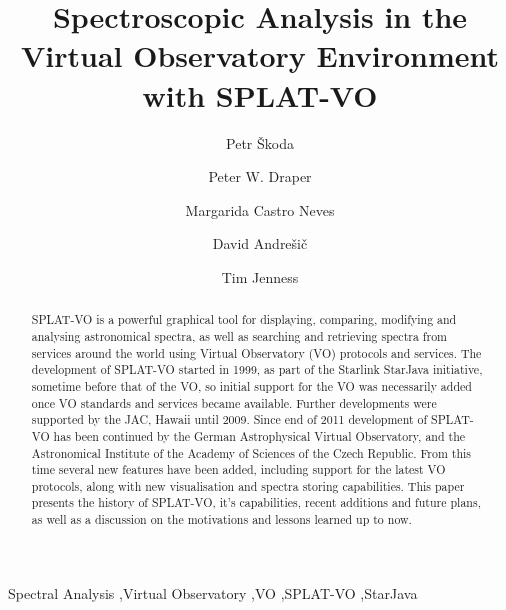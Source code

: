 \documentclass[final,authoryear,5p,times,twocolumn]{elsarticle}
\begin{document}
\begin{frontmatter}

\title{Spectroscopic Analysis in the Virtual Observatory Environment with SPLAT-VO}

\author[OND]{Petr \v{S}koda}
\author[DUR]{Peter W. Draper}
\author[HDB]{Margarida Castro Neves}
\author[VSB]{David Andre\v{s}i\v{c}}
\author[COR]{Tim Jenness}

\address[OND]{Astronomical Institute of the Academy of Sciences,Fri\v{c}ova~298, 251\,65, Ond\v{r}ejov, Czech Republic}
\address[DUR]{Department of Physics, Institute for Computational
Cosmology, University of Durham, South Road, Durham DH1 3LE, UK}
\address[HDB]{Universit\"a{}t Heidelberg, Astronomisches Rechen-Institut,
M\"o{}nchhofstra\ss{}e 12--14, 69120 Heidelberg, Germany}
\address[VSB]{Department of Computer Science, Faculty of Electrical
Engineering and Computer Science, V\v{S}B --- Technical University of Ostrava\\
 17. listopadu 15, 708 33 Ostrava-Poruba, Czech Republic}
\address[COR]{Department of Astronomy, Cornell University, Ithaca, NY 14853, USA}


\begin{abstract}
  SPLAT-VO is a powerful graphical tool for displaying, comparing, modifying
  and analysing astronomical spectra, as well as searching and retrieving
  spectra from services around the world using Virtual Observatory (VO)
  protocols and services. The development of SPLAT-VO started in 1999, as part
  of the Starlink StarJava initiative, sometime before that of the VO, so
  initial support for the VO was necessarily added once VO standards and
  services became available. Further developments were supported by the JAC,
  Hawaii until 2009. Since end of 2011 development of SPLAT-VO has been
  continued by the German Astrophysical Virtual Observatory, and the
  Astronomical Institute of the Academy of Sciences of the Czech Republic.
  From this time several new features have been added, including support for
  the latest VO protocols, along with new visualisation and spectra storing
  capabilities. This paper presents the history of SPLAT-VO, it's
  capabilities, recent additions and future plans, as well as a discussion on
  the motivations and lessons learned up to now.
\end{abstract}
\begin{keyword}
Spectral Analysis \sep Virtual Observatory \sep VO \sep SPLAT-VO \sep StarJava
\end{keyword}
\end{frontmatter}
\end{document}
